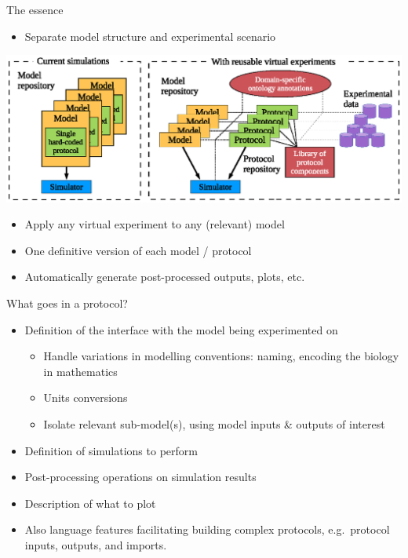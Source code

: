 \documentclass[t,xcolor={usenames,dvipsnames}]{beamer}
\newcommand{\subitem}[1]{\begin{itemize}[<.->]\item #1 \end{itemize}}
\begin{document}
\begin{frame}{The essence}
\subitem{Separate \alert{model structure} and \alert{experimental scenario}}
\vspace{-.2cm}
\hspace{-1cm}\includegraphics[width=1.185\textwidth]{virtual_expts_schematic}
\vspace{-.31cm}
\begin{itemize}
\item Apply any \alert{virtual experiment} to any (relevant) model
\item One definitive version of each model / protocol
\item Automatically generate post-processed outputs, plots, etc.
\end{itemize}
\end{frame}


\begin{frame}{What goes in a protocol?}
\begin{itemize}
\item Definition of the interface with the model being experimented on
  \begin{itemize}
  \item Handle variations in modelling conventions: naming, encoding the biology in mathematics
  \item Units conversions
  \item Isolate relevant sub-model(s), using model inputs \& outputs of interest
  \end{itemize}
\item Definition of simulations to perform
\item Post-processing operations on simulation results
\item Description of what to plot
\vspace{.5cm}
\item Also language features facilitating building complex protocols, e.g.\ protocol inputs, outputs, and imports.
\end{itemize}
\end{frame}
\end{document}
